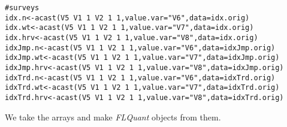 \documentclass[a4paper,english,10pt]{article}\usepackage[]{graphicx}\usepackage[]{color}
\makeatletter
\newcommand{\hlnum}[1]{\textcolor[rgb]{0.2,0.2,0.2}{#1}}%
\newcommand{\hlstr}[1]{\textcolor[rgb]{0.2,0.2,0.2}{#1}}%
\newcommand{\hlcom}[1]{\textcolor[rgb]{0.2,0.267,0.4}{#1}}%
\newcommand{\hlopt}[1]{\textcolor[rgb]{0.2,0.2,0.2}{#1}}%
\newcommand{\hlstd}[1]{\textcolor[rgb]{0,0,0}{#1}}%
\newcommand{\hlkwb}[1]{\textcolor[rgb]{0.361,0.506,0.596}{#1}}%
\newcommand{\hlkwc}[1]{\textcolor[rgb]{0.361,0.506,0.596}{#1}}%
\newcommand{\hlkwd}[1]{\textcolor[rgb]{0.361,0.506,0.596}{#1}}%
\newenvironment{kframe}{%
 \def\at@end@of@kframe{}%
 \ifinner\ifhmode%
  \def\at@end@of@kframe{\end{minipage}}%
  \begin{minipage}{\columnwidth}%
 \fi\fi%
 \def\FrameCommand##1{\hskip\@totalleftmargin \hskip-\fboxsep
 \colorbox{shadecolor}{##1}\hskip-\fboxsep
     \hskip-\linewidth \hskip-\@totalleftmargin \hskip\columnwidth}%
 \MakeFramed {\advance\hsize-\width
   \@totalleftmargin\z@ \linewidth\hsize
   \@setminipage}}%
 {\par\unskip\endMakeFramed%
 \at@end@of@kframe}
\newenvironment{knitrout}{}{} %
\newcommand{\class}[1]{{\textit{#1}}}
\makeatother
\begin{document}
\begin{knitrout}
\begin{kframe}
\begin{alltt}
\hlcom{# surveys}
\hlstd{idx.n} \hlkwb{<-} \hlkwd{acast}\hlstd{(V5}\hlopt{~}\hlstd{V1}\hlopt{~}\hlnum{1}\hlopt{~}\hlstd{V2}\hlopt{~}\hlnum{1}\hlopt{~}\hlnum{1}\hlstd{,} \hlkwc{value.var}\hlstd{=}\hlstr{"V6"}\hlstd{,} \hlkwc{data}\hlstd{=idx.orig)}
\hlstd{idx.wt} \hlkwb{<-} \hlkwd{acast}\hlstd{(V5}\hlopt{~}\hlstd{V1}\hlopt{~}\hlnum{1}\hlopt{~}\hlstd{V2}\hlopt{~}\hlnum{1}\hlopt{~}\hlnum{1}\hlstd{,} \hlkwc{value.var}\hlstd{=}\hlstr{"V7"}\hlstd{,} \hlkwc{data}\hlstd{=idx.orig)}
\hlstd{idx.hrv} \hlkwb{<-} \hlkwd{acast}\hlstd{(V5}\hlopt{~}\hlstd{V1}\hlopt{~}\hlnum{1}\hlopt{~}\hlstd{V2}\hlopt{~}\hlnum{1}\hlopt{~}\hlnum{1}\hlstd{,} \hlkwc{value.var}\hlstd{=}\hlstr{"V8"}\hlstd{,} \hlkwc{data}\hlstd{=idx.orig)}
\hlstd{idxJmp.n} \hlkwb{<-} \hlkwd{acast}\hlstd{(V5}\hlopt{~}\hlstd{V1}\hlopt{~}\hlnum{1}\hlopt{~}\hlstd{V2}\hlopt{~}\hlnum{1}\hlopt{~}\hlnum{1}\hlstd{,} \hlkwc{value.var}\hlstd{=}\hlstr{"V6"}\hlstd{,} \hlkwc{data}\hlstd{=idxJmp.orig)}
\hlstd{idxJmp.wt} \hlkwb{<-} \hlkwd{acast}\hlstd{(V5}\hlopt{~}\hlstd{V1}\hlopt{~}\hlnum{1}\hlopt{~}\hlstd{V2}\hlopt{~}\hlnum{1}\hlopt{~}\hlnum{1}\hlstd{,} \hlkwc{value.var}\hlstd{=}\hlstr{"V7"}\hlstd{,} \hlkwc{data}\hlstd{=idxJmp.orig)}
\hlstd{idxJmp.hrv} \hlkwb{<-} \hlkwd{acast}\hlstd{(V5}\hlopt{~}\hlstd{V1}\hlopt{~}\hlnum{1}\hlopt{~}\hlstd{V2}\hlopt{~}\hlnum{1}\hlopt{~}\hlnum{1}\hlstd{,} \hlkwc{value.var}\hlstd{=}\hlstr{"V8"}\hlstd{,} \hlkwc{data}\hlstd{=idxJmp.orig)}
\hlstd{idxTrd.n} \hlkwb{<-} \hlkwd{acast}\hlstd{(V5}\hlopt{~}\hlstd{V1}\hlopt{~}\hlnum{1}\hlopt{~}\hlstd{V2}\hlopt{~}\hlnum{1}\hlopt{~}\hlnum{1}\hlstd{,} \hlkwc{value.var}\hlstd{=}\hlstr{"V6"}\hlstd{,} \hlkwc{data}\hlstd{=idxTrd.orig)}
\hlstd{idxTrd.wt} \hlkwb{<-} \hlkwd{acast}\hlstd{(V5}\hlopt{~}\hlstd{V1}\hlopt{~}\hlnum{1}\hlopt{~}\hlstd{V2}\hlopt{~}\hlnum{1}\hlopt{~}\hlnum{1}\hlstd{,} \hlkwc{value.var}\hlstd{=}\hlstr{"V7"}\hlstd{,} \hlkwc{data}\hlstd{=idxTrd.orig)}
\hlstd{idxTrd.hrv} \hlkwb{<-} \hlkwd{acast}\hlstd{(V5}\hlopt{~}\hlstd{V1}\hlopt{~}\hlnum{1}\hlopt{~}\hlstd{V2}\hlopt{~}\hlnum{1}\hlopt{~}\hlnum{1}\hlstd{,} \hlkwc{value.var}\hlstd{=}\hlstr{"V8"}\hlstd{,} \hlkwc{data}\hlstd{=idxTrd.orig)}
\end{alltt}
\end{kframe}
\end{knitrout}

We take the arrays and make \class{FLQuant} objects from them.
\end{document}
